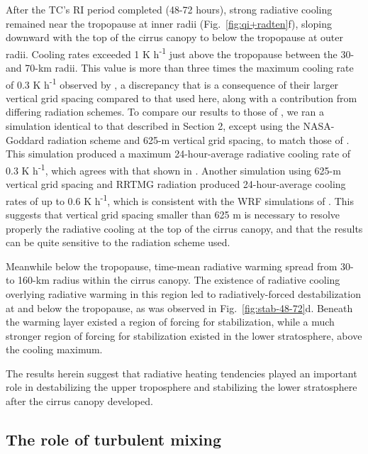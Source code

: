 \documentclass{ametsoc}
\begin{document}
After the TC's RI period completed (48-72 hours), strong radiative cooling remained near the tropopause at inner radii (Fig.~\ref{fig:qi+radten}f), sloping downward with the top of the cirrus canopy to below the tropopause at outer radii.
Cooling rates exceeded 1 K h\textsuperscript{-1} just above the tropopause between the 30- and 70-km radii.
This value is more than three times the maximum cooling rate of 0.3 K h\textsuperscript{-1} observed by \cite{buetal}, a discrepancy that is a consequence of their larger vertical grid spacing compared to that used here, along with a contribution from differing radiation schemes.
To compare our results to those of \cite{buetal}, we ran a simulation identical to that described in Section 2, except using the NASA-Goddard radiation scheme and 625-m vertical grid spacing, to match those of \cite{buetal}.
This simulation produced a maximum 24-hour-average radiative cooling rate of 0.3 K h\textsuperscript{-1}, which agrees with that shown in \cite{buetal}.
Another simulation using 625-m vertical grid spacing and RRTMG radiation produced 24-hour-average cooling rates of up to 0.6 K h\textsuperscript{-1}, which is consistent with the WRF simulations of \cite{buetal}.
This suggests that vertical grid spacing smaller than 625 m is necessary to resolve properly the radiative cooling at the top of the cirrus canopy, and that the results can be quite sensitive to the radiation scheme used.

Meanwhile below the tropopause, time-mean radiative warming spread from 30- to 160-km radius within the cirrus canopy.
The existence of radiative cooling overlying radiative warming in this region led to radiatively-forced destabilization at and below the tropopause, as was observed in Fig.~\ref{fig:stab-48-72}d.
Beneath the warming layer existed a region of forcing for stabilization, while a much stronger region of forcing for stabilization existed in the lower stratosphere, above the cooling maximum.

The results herein suggest that radiative heating tendencies played an important role in destabilizing the upper troposphere and stabilizing the lower stratosphere after the cirrus canopy developed.

  \subsection{The role of turbulent mixing}
\end{document}

